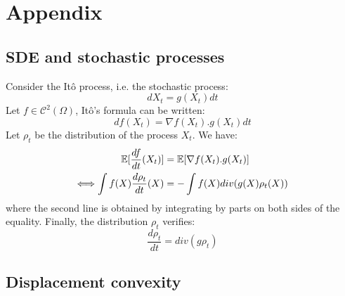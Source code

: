 
\section{Appendix}

\subsection{SDE and stochastic processes}

Consider the Itô process, i.e. the stochastic process:
\begin{equation}
dX_t=g(X_t)dt
\end{equation}
Let $f \in \mathcal{C}^2(\Omega)$, Itô's formula can be written:
\begin{equation*}
df(X_t)=\nabla f(X_t).g(X_t)dt
\end{equation*}
Let $\rho_t$ be the distribution of the process $X_t$. We have:
\begin{align*}
{{\mathbb E}}[\frac{df}{dt}(X_t)]&= {{\mathbb E}}[\nabla f(X_t).g(X_t)]\\
\Longleftrightarrow \int f(X) \frac{d \rho_t}{dt}(X)&=-\int f(X)div(g(X)\rho_t(X))
\end{align*}
where the second line is obtained by integrating by parts on both sides of the equality. Finally, the distribution $\rho_t$ verifies: 
\begin{equation*}
\frac{d\rho_t}{dt}=div(g\rho_t)
\end{equation*}




\subsection{Displacement convexity}


